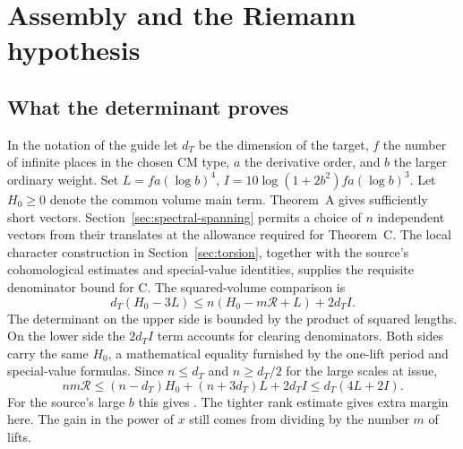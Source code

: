 \section{Assembly and the Riemann hypothesis}\label{sec:endpoint}
\subsection*{What the determinant proves}
In the notation of the guide let $d_T$ be the dimension of the target, $f$ the number of infinite places in the chosen CM type, $a$ the derivative order, and $b$ the larger ordinary weight. Set $L=fa(\log b)^4$, $I=10\log(1+2b^2)fa(\log b)^3$. Let $H_0\ge0$ denote the common volume main term. Theorem~A gives sufficiently short vectors. Section~\ref{sec:spectral-spanning} permits a choice of $n$ independent vectors from their translates at the allowance required for Theorem~C. The local character construction in Section~\ref{sec:torsion}, together with the source's cohomological estimates and special-value identities, supplies the requisite denominator bound for C. The squared-volume comparison is
\[
 d_T(H_0-3L)\le n(H_0-m\mathcal R+L)+2d_T I.
\]
The determinant on the upper side is bounded by the product of squared lengths. On the lower side the $2d_T I$ term accounts for clearing denominators. Both sides carry the same $H_0$, a mathematical equality furnished by the one-lift period and special-value formulas. Since $n\le d_T$ and $n\ge d_T/2$ for the large scales at issue,
\[
 nm\mathcal R\le(n-d_T)H_0+(n+3d_T)L+2d_T I
              \le d_T(4L+2I).
\]
For the source's large $b$ this gives . The tighter rank estimate gives extra margin here. The gain in the power of $x$ still comes from dividing by the number $m$ of lifts.

